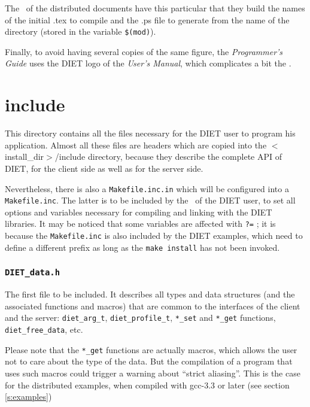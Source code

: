 The \makeam\ of the distributed documents have this particular that they build
the names of the initial \textsf{.tex} to compile and the \textsf{.ps} file to
generate from the name of the directory (stored in the variable \verb+$(mod)+).

Finally, to avoid having several copies of the same figure, the
\textit{Programmer's Guide} uses the DIET logo of the \textit{User's Manual},
which complicates a bit the \makeam.



\section{\textsf{include}}
\label{s:include}

This directory contains all the files necessary for the DIET user to program his
application. Almost all these files are headers which are copied into the
\textsf{$<$install\_dir$>$/include} directory, because they describe the
complete API of DIET, for the client side as well as for the server side.

Nevertheless, there is also a \texttt{Makefile.inc.in} which will be configured
into a \texttt{Makefile.inc}. The latter is to be included by the \make\ of the
DIET user, to set all options and variables necessary for compiling and linking
with the DIET libraries. It may be noticed that some variables are affected with
\texttt{?=} ; it is because the \texttt{Makefile.inc} is also included by the
DIET examples, which need to define a different prefix as long as the
\texttt{make install} has not been invoked.



\subsubsection{\tt DIET\_data.h}

The first file to be included. It describes all types and data structures (and
the associated functions and macros) that are common to the interfaces of the
client and the server: \verb+diet_arg_t+, \verb+diet_profile_t+, \verb+*_set+
and \verb+*_get+ functions, \verb+diet_free_data+, etc.

Please note that the \verb+*_get+ functions are actually macros, which allows
the user not to care about the type of the data. But the compilation of a
program that uses such macros could trigger a warning about ``strict aliasing''.
This is the case for the distributed examples, when compiled with
\textsf{gcc-3.3} or later (see section \ref{s:examples})


